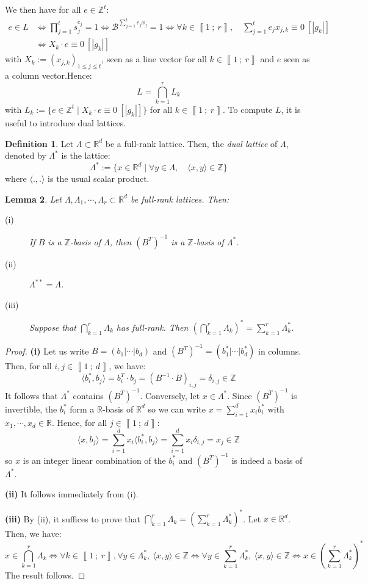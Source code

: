 \documentclass[a4paper,10pt]{report}
\theoremstyle{definition}
\newtheorem{definition}{Definition}[chapter]
\theoremstyle{plain}
\newtheorem{lemma}[definition]{Lemma}
\theoremstyle{definition}
\newcommand{\Z}{\mathbb{Z}}
\newcommand{\R}{\mathbb{R}}
\newcommand{\m}[1]{\mathcal{#1}}
\renewcommand{\i}[2]{\left\llbracket #1~;~#2\right\rrbracket}
\renewcommand{\(}{\left(}
\renewcommand{\)}{\right)}
\begin{document}
We then have for all $e\in\Z^t$:
\begin{align*} e\in L&\Longleftrightarrow \prod_{j=1}^t s_j^{e_j}=1\Longleftrightarrow \m{B}^{\sum_{j=1}^t e_jx_j}=1\Longleftrightarrow \forall k\in\i{1}{r},\quad \sum_{j=1}^t e_jx_{j,k}\equiv 0 \  [|g_k|]\\
&\Longleftrightarrow X_k\cdot e\equiv 0 \ [|g_k|]
\end{align*}
with $X_k:=(x_{j,k})_{1\leq j\leq t}$, seen as a line vector for all $k\in\i{1}{r}$ and $e$ seen as a column vector.Hence:
\[L=\bigcap_{k=1}^r L_k\]
with $L_k:=\{e\in\Z^t\mid X_k\cdot e\equiv 0 \ [|g_k|]\}$ for all $k\in\i{1}{r}$.  To compute $L$, it is useful to introduce dual lattices. 

\begin{definition}
Let $\Lambda\subset\R^d$ be a full-rank lattice. Then, the \emph{dual lattice} of $\Lambda$, denoted by $\Lambda^*$ is the lattice:
\[\Lambda^*:=\{x\in\R^d\mid \forall y\in\Lambda, \quad \langle x,y\rangle\in\Z\}\]
where $\langle.,.\rangle$ is the usual scalar product.
\end{definition}

\begin{lemma}\label{lemma 16}
Let $\Lambda, \Lambda_1, \cdots, \Lambda_r\subset\R^d$ be full-rank lattices.  Then:

\begin{description}
\item[(i)] If $B$ is a $\Z$-basis of $\Lambda$, then $(B^T)^{-1}$ is a $\Z$-basis of $\Lambda^*$.
\item[(ii)] $\Lambda^{**}=\Lambda$.
\item[(iii)] Suppose that $\bigcap_{k=1}^r\Lambda_k$ has full-rank. Then $ \(\bigcap_{k=1}^r\Lambda_k\)^*=\sum_{k=1}^r \Lambda_k^*$.
\end{description}
\end{lemma}

\begin{proof}
\textbf{(i)} Let us write $B=(b_1|\cdots|b_d)$ and  $(B^T)^{-1}=(b_1^*|\cdots|b_d^*)$ in columns.  Then, for all $i,j \in\i{1}{d}$, we have:
\[\langle b_i^*, b_j\rangle=b_i^T\cdot b_j=(B^{-1}\cdot B)_{i, j}=\delta_{i,j}\in\Z\]
It follows that $\Lambda^*$ contains $(B^T)^{-1}$. Conversely, let $x\in\Lambda^*$. Since $(B^T)^{-1}$ is invertible, the $b_i^*$ form a $\R$-basis of $\R^d$ so we can write $x=\sum_{i=1}^d x_i b_i^*$ with $x_1, \cdots, x_d\in\R$. Hence, for all $j\in\i{1}{d}$:
\[\langle x, b_j\rangle=\sum_{i=1}^d x_i\langle b_i^*,b_j\rangle=\sum_{i=1}^d x_i\delta_{i, j}=x_j\in\Z\]
so $x$ is an integer linear combination of the $b_i^*$ and $(B^T)^{-1}$ is indeed a basis of $\Lambda^*$.

\textbf{(ii)} It follows immediately from (i).

\textbf{(iii)} By (ii), it suffices to prove that $\bigcap_{k=1}^r\Lambda_k=\(\sum_{k=1}^r \Lambda_k^*\)^*$. Let $x\in\R^d$. Then, we have:
\[x\in \bigcap_{k=1}^r\Lambda_k \Longleftrightarrow \forall k\in\i{1}{r}, \forall y\in \Lambda_k^*,  \  \langle x,y\rangle\in \Z\Longleftrightarrow \forall y\in\sum_{k=1}^r\Lambda_k^*, \ \langle x, y\rangle\in\Z\Longleftrightarrow x\in \(\sum_{k=1}^r \Lambda_k^*\)^*\]
The result follows.
\end{proof}
\end{document}
